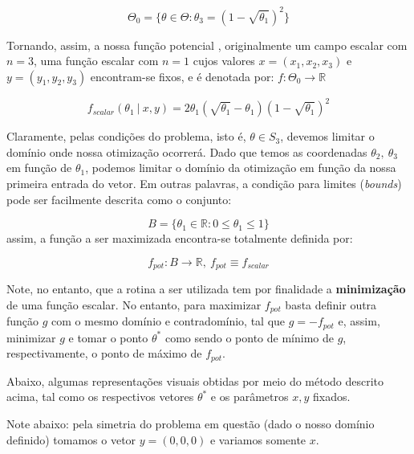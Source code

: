 \documentclass[11pt, a4paper]{article}
\begin{document}
$$\Theta_0 = \{ \theta \in \Theta : \theta_3 = (1-\sqrt{\theta_1})^2  \}$$

Tornando, assim, a nossa função potencial , originalmente um campo escalar com $n=3$, uma função escalar com $n=1$ cujos valores $x = (x_1, x_2, x_3)$ e $y = (y_1 , y_2, y_3)$ encontram-se fixos, e é denotada por:  $f: \Theta_0 \rightarrow \mathbb{R}$

$$
f_{scalar}(\theta_1 \ | \ x,y) =  2\theta_1(\sqrt{\theta_1} - \theta_1)(1-\sqrt{\theta_1})^2
$$

Claramente, pelas condições do problema, isto é, $\theta \in S_3$, devemos limitar o domínio onde nossa otimização ocorrerá. Dado que temos as coordenadas $\theta_2, \ \theta_3$ em função de $\theta_1$, podemos limitar o domínio da otimização em função da nossa primeira entrada do vetor. Em outras palavras, a condição para limites (\textit{bounds}) pode ser facilmente descrita como o conjunto:

$$B = \{ \theta_1 \in \mathbb{R} : 0 \leq \theta_1 \leq 1 \}$$ assim, a função a ser maximizada encontra-se totalmente definida por:

$$f_{pot}: B \rightarrow \mathbb{R}, \ f_{pot} \equiv f_{scalar} $$

Note, no entanto, que a rotina a ser utilizada tem por finalidade a \textbf{minimização} de uma função escalar. No entanto, para maximizar $f_{pot}$ basta definir outra função $g$ com o mesmo domínio e contradomínio, tal que $g = -f_{pot}$ e, assim, minimizar $g$ e tomar o ponto $\theta^*$ como sendo o ponto de mínimo de $g$, respectivamente, o ponto de máximo de $f_{pot}$. 
    
Abaixo, algumas representações visuais obtidas por meio do método descrito acima, tal como os respectivos vetores $\theta^*$ e os parâmetros $x,y$ fixados.


Note abaixo: pela simetria do problema em questão (dado o nosso domínio definido) tomamos o vetor $y = (0,0,0)$ e variamos somente $x$.
\end{document}
